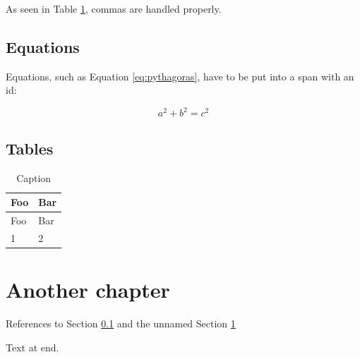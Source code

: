 As seen in Table \ref{tab:foobar}, commas are handled properly.

\hypertarget{equationchapter}{%
\subsection{Equations}\label{equationchapter}}

Equations, such as Equation \ref{eq:pythagoras}, have to be put into a
span with an id:

$$\label{eq:pythagoras}a^2 + b^2 = c^2$$

\hypertarget{tables}{%
\subsection{Tables}\label{tables}}

\begin{longtable}[]{@{}ll@{}}
\caption{Caption\label{tab:foobar}}\tabularnewline
\toprule
Foo & Bar \\
\midrule
\endfirsthead
\toprule
Foo & Bar \\
\midrule
\endhead
1 & 2 \\
\bottomrule
\end{longtable}

\hypertarget{another-chapter}{%
\section{Another chapter}\label{another-chapter}}

References to Section \ref{equationchapter} and the unnamed
Section \ref{another-chapter}

Text at end.
